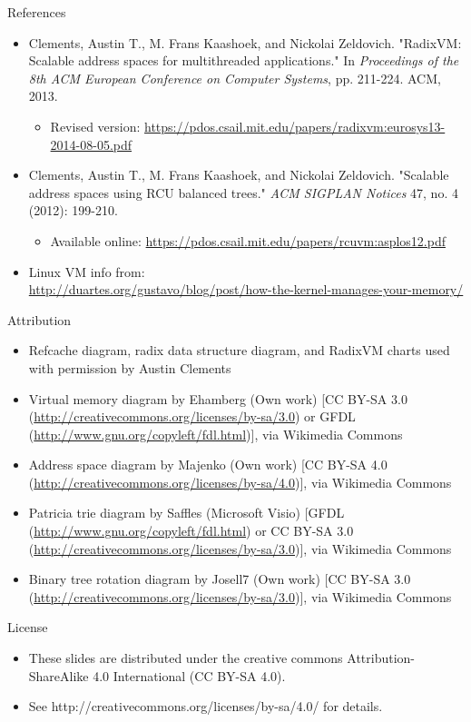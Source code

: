 \documentclass[aspectratio=169]{beamer}
\newcommand{\bi}{\begin{itemize}}
\newcommand{\ei}{\end{itemize}}
\begin{document}
\begin{frame}[noframenumbering]{References}
  \bi
\item Clements, Austin T., M. Frans Kaashoek, and Nickolai Zeldovich. "RadixVM: Scalable address spaces for multithreaded applications." In \emph{Proceedings of the 8th ACM European Conference on Computer Systems}, pp. 211-224. ACM, 2013.
  \bi
\item Revised version: \url{https://pdos.csail.mit.edu/papers/radixvm:eurosys13-2014-08-05.pdf}
  \ei
\item Clements, Austin T., M. Frans Kaashoek, and Nickolai Zeldovich. "Scalable address spaces using RCU balanced trees." \emph{ACM SIGPLAN Notices} 47, no. 4 (2012): 199-210.
  \bi
\item Available online: \url{https://pdos.csail.mit.edu/papers/rcuvm:asplos12.pdf}
  \ei
\item Linux VM info from:\\ \url{http://duartes.org/gustavo/blog/post/how-the-kernel-manages-your-memory/}
  \ei
\end{frame}

\begin{frame}[noframenumbering]{Attribution}
  \bi
\item Refcache diagram, radix data structure diagram, and RadixVM charts used with permission by Austin Clements
\item Virtual memory diagram by Ehamberg (Own work) [CC BY-SA 3.0 (\url{http://creativecommons.org/licenses/by-sa/3.0}) or GFDL (\url{http://www.gnu.org/copyleft/fdl.html})], via Wikimedia Commons
\item Address space diagram by Majenko (Own work) [CC BY-SA 4.0 (\url{http://creativecommons.org/licenses/by-sa/4.0})], via Wikimedia Commons
\item Patricia trie diagram by Saffles (Microsoft Visio) [GFDL (\url{http://www.gnu.org/copyleft/fdl.html}) or CC BY-SA 3.0 (\url{http://creativecommons.org/licenses/by-sa/3.0})], via Wikimedia Commons
  \item Binary tree rotation diagram by Josell7 (Own work) [CC BY-SA 3.0 (\url{http://creativecommons.org/licenses/by-sa/3.0})], via Wikimedia Commons
  \ei
\end{frame}

\begin{frame}[noframenumbering]{License}
  \bi
\item These slides are distributed under the creative commons
  Attribution-ShareAlike 4.0 International (CC BY-SA 4.0).
\item See http://creativecommons.org/licenses/by-sa/4.0/ for details.
  \ei
\end{frame}
\end{document}
